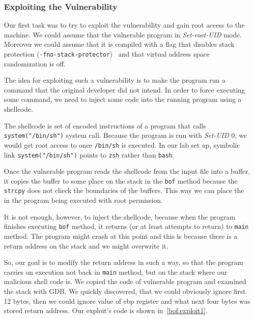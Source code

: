 \documentclass[12pt, a4paper, pdflatex]{article}
\begin{document}
\subsubsection{Exploiting the Vulnerability}

Our first task was to try to exploit the vulnerability and gain root access to the machine. We could assume that the vulnerable program in \emph{Set-root-UID} mode. Moreover we could assume that it is compiled with a flag that disables stack protection (\texttt{-fno-stack-protector})~\cite{gnu13} and that virtual address space randomization is off.

The idea for exploiting such a vulnerability is to make the program run a command that the original developer did not intend. In order to force executing some command, we need to inject some code into the running program using a shellcode. 

The shellcode is set of encoded instructions of a program that calls \texttt{system("/bin/sh")} system call. Because the program is run with \emph{Set-UID} 0, we would get root access to once \texttt{/bin/sh} is executed. In our lab set up, symbolic link \texttt{system("/bin/sh")} points to \texttt{zsh} rather than \texttt{bash}.

Once the vulnerable program reads the shellcode from the input file into a buffer, it copies the buffer to some place on the stack in the \texttt{bof} method because the \texttt{strcpy} does not check the boundaries of the buffers. This way we can place the in the program being executed with root permission.

It is not enough, however, to inject the shellcode, because when the program finishes executing \texttt{bof} method, it returns (or at least attempts to return) to \texttt{main} method. The program might crash at this point and this is because there is a return address on the stack and we might overwrite it.

So, our goal is to modify the return address in such a way, so that the program carries on execution not back in \texttt{main} method, but on the stack where our malicious shell code is. We copied the code of vulnerable program and examined the stack with GDB. We quickly discovered, that we could obviously ignore first 12 bytes, then we could ignore value of ebp register and what next four bytes was stored return address. Our exploit's code is shown in~\ref{bof:exploit1}. 
\end{document}
